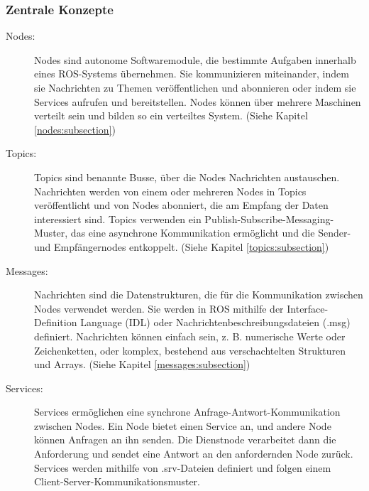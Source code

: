 \subsubsection{Zentrale Konzepte} \label{zentrale_konzepte:subsubsection}
\begin{description}
    \item[Nodes:] Nodes sind autonome Softwaremodule, die bestimmte Aufgaben innerhalb eines ROS-Systems übernehmen. Sie kommunizieren miteinander, indem sie Nachrichten zu Themen veröffentlichen und abonnieren oder indem sie Services aufrufen und bereitstellen. Nodes können über mehrere Maschinen verteilt sein und bilden so ein verteiltes System. (Siehe Kapitel \ref{nodes:subsection})
    
    \item[Topics:] Topics sind benannte Busse, über die Nodes Nachrichten austauschen. Nachrichten werden von einem oder mehreren Nodes in Topics veröffentlicht und von Nodes abonniert, die am Empfang der Daten interessiert sind. Topics verwenden ein Publish-Subscribe-Messaging-Muster, das eine asynchrone Kommunikation ermöglicht und die Sender- und Empfängernodes entkoppelt. (Siehe Kapitel \ref{topics:subsection})
    
    \item[Messages:] Nachrichten sind die Datenstrukturen, die für die Kommunikation zwischen Nodes verwendet werden. Sie werden in ROS mithilfe der Interface-Definition Language (IDL) oder Nachrichtenbeschreibungsdateien (.msg) definiert. Nachrichten können einfach sein, z. B. numerische Werte oder Zeichenketten, oder komplex, bestehend aus verschachtelten Strukturen und Arrays. (Siehe Kapitel \ref{messages:subsection})
    
    \item[Services:] Services ermöglichen eine synchrone Anfrage-Antwort-Kommunikation zwischen Nodes. Ein Node bietet einen Service an, und andere Node können Anfragen an ihn senden. Die Dienstnode verarbeitet dann die Anforderung und sendet eine Antwort an den anfordernden Node zurück. Services werden mithilfe von .srv-Dateien definiert und folgen einem Client-Server-Kommunikationsmuster.
\end{description}

